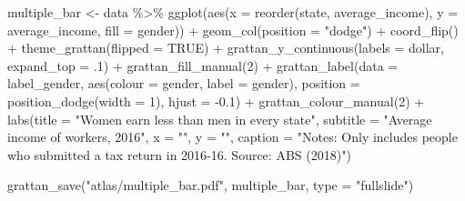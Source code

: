 \documentclass[
]{book}
\newenvironment{Shaded}{\begin{snugshade}}{\end{snugshade}}
\newcommand{\AttributeTok}[1]{\textcolor[rgb]{0.77,0.63,0.00}{#1}}
\newcommand{\ConstantTok}[1]{\textcolor[rgb]{0.00,0.00,0.00}{#1}}
\newcommand{\DecValTok}[1]{\textcolor[rgb]{0.00,0.00,0.81}{#1}}
\newcommand{\FloatTok}[1]{\textcolor[rgb]{0.00,0.00,0.81}{#1}}
\newcommand{\FunctionTok}[1]{\textcolor[rgb]{0.00,0.00,0.00}{#1}}
\newcommand{\NormalTok}[1]{#1}
\newcommand{\OtherTok}[1]{\textcolor[rgb]{0.56,0.35,0.01}{#1}}
\newcommand{\SpecialCharTok}[1]{\textcolor[rgb]{0.00,0.00,0.00}{#1}}
\newcommand{\StringTok}[1]{\textcolor[rgb]{0.31,0.60,0.02}{#1}}
\begin{document}
\begin{Shaded}
\begin{Highlighting}[]
\NormalTok{multiple\_bar }\OtherTok{\textless{}{-}}\NormalTok{ data }\SpecialCharTok{\%\textgreater{}\%} 
  \FunctionTok{ggplot}\NormalTok{(}\FunctionTok{aes}\NormalTok{(}\AttributeTok{x =} \FunctionTok{reorder}\NormalTok{(state, average\_income), }
             \AttributeTok{y =}\NormalTok{ average\_income,}
             \AttributeTok{fill =}\NormalTok{ gender)) }\SpecialCharTok{+} 
  \FunctionTok{geom\_col}\NormalTok{(}\AttributeTok{position =} \StringTok{"dodge"}\NormalTok{) }\SpecialCharTok{+} 
  \FunctionTok{coord\_flip}\NormalTok{() }\SpecialCharTok{+} 
  \FunctionTok{theme\_grattan}\NormalTok{(}\AttributeTok{flipped =} \ConstantTok{TRUE}\NormalTok{) }\SpecialCharTok{+} 
  \FunctionTok{grattan\_y\_continuous}\NormalTok{(}\AttributeTok{labels =}\NormalTok{ dollar, }
                       \AttributeTok{expand\_top =}\NormalTok{ .}\DecValTok{1}\NormalTok{) }\SpecialCharTok{+} 
  \FunctionTok{grattan\_fill\_manual}\NormalTok{(}\DecValTok{2}\NormalTok{) }\SpecialCharTok{+} 
  \FunctionTok{grattan\_label}\NormalTok{(}\AttributeTok{data =}\NormalTok{ label\_gender, }
                \FunctionTok{aes}\NormalTok{(}\AttributeTok{colour =}\NormalTok{ gender,}
                    \AttributeTok{label =}\NormalTok{ gender), }
                \AttributeTok{position =} \FunctionTok{position\_dodge}\NormalTok{(}\AttributeTok{width =} \DecValTok{1}\NormalTok{), }
                \AttributeTok{hjust =} \SpecialCharTok{{-}}\FloatTok{0.1}\NormalTok{) }\SpecialCharTok{+} 
  \FunctionTok{grattan\_colour\_manual}\NormalTok{(}\DecValTok{2}\NormalTok{) }\SpecialCharTok{+} 
  \FunctionTok{labs}\NormalTok{(}\AttributeTok{title =} \StringTok{"Women earn less than men in every state"}\NormalTok{,}
       \AttributeTok{subtitle =} \StringTok{"Average income of workers, 2016"}\NormalTok{,}
       \AttributeTok{x =} \StringTok{""}\NormalTok{,}
       \AttributeTok{y =} \StringTok{""}\NormalTok{,}
       \AttributeTok{caption =} \StringTok{"Notes: Only includes people who submitted a tax return in 2016{-}16. Source: ABS (2018)"}\NormalTok{)}
\end{Highlighting}
\end{Shaded}

\begin{Shaded}
\begin{Highlighting}[]
\FunctionTok{grattan\_save}\NormalTok{(}\StringTok{"atlas/multiple\_bar.pdf"}\NormalTok{, multiple\_bar, }\AttributeTok{type =} \StringTok{"fullslide"}\NormalTok{)}
\end{Highlighting}
\end{Shaded}
\end{document}
